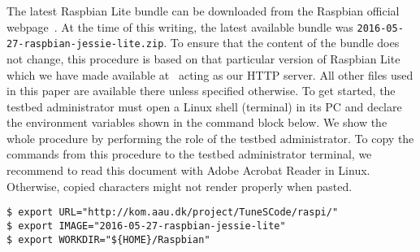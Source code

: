 
The latest Raspbian Lite bundle can be downloaded from the Raspbian
official webpage~\cite{raspbian}. At the time of this writing, the latest
available bundle was \texttt{2016-05-27-raspbian-jessie-lite.zip}.
To ensure that the content of the bundle does not change, this procedure
is based on that particular version of Raspbian Lite which we have
made available at~\cite{tunescode_webpage} acting as our \ac{HTTP} server.
All other files used in this paper are available there unless specified
otherwise. To get started, the testbed administrator must open a Linux
shell (terminal) in its \ac{PC} and declare the environment variables shown
in the command block below. We show the whole procedure by performing the role
of the testbed administrator. To copy the commands from this procedure to the
testbed administrator terminal, we recommend to read this document
with Adobe Acrobat Reader in Linux. Otherwise, copied characters might not
render properly when pasted.



\begin{lstlisting}[]
$ export URL="http://kom.aau.dk/project/TuneSCode/raspi/"
$ export IMAGE="2016-05-27-raspbian-jessie-lite"
$ export WORKDIR="${HOME}/Raspbian"
\end{lstlisting}
\FloatBarrier
\vspace{-5mm}

